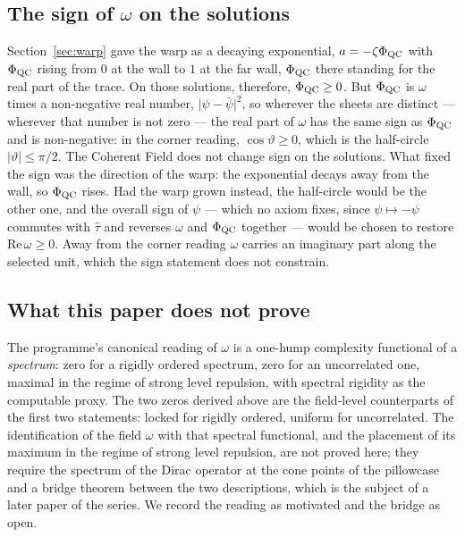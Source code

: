 \subsection{The sign of $\omega$ on the solutions}\label{sec:half-circle}

Section~\ref{sec:warp} gave the warp as a decaying exponential,
$a=-\zeta\Phi_{\mathrm{QC}}$ with $\Phi_{\mathrm{QC}}$ rising from $0$ at the wall to $1$ at the far
wall, $\Phi_{\mathrm{QC}}$ there standing for the real part of the trace. On those
solutions, therefore, $\Phi_{\mathrm{QC}}\ge0$. But $\Phi_{\mathrm{QC}}$ is $\omega$ times a
non-negative real number, $\lvert\psi-\bar\psi\rvert^{2}$, so wherever the
sheets are distinct --- wherever that number is not zero --- the real part
of $\omega$ has the same sign as $\Phi_{\mathrm{QC}}$ and is non-negative: in the corner
reading, $\cos\vartheta\ge0$, which is the half-circle
$\lvert\vartheta\rvert\le\pi/2$. The Coherent Field does not change sign on
the solutions. What fixed the sign was the direction of the warp: the
exponential decays away from the wall, so $\Phi_{\mathrm{QC}}$ rises. Had the warp grown
instead, the half-circle would be the other one, and the overall sign of
$\psi$ --- which no axiom fixes, since $\psi\mapsto-\psi$ commutes with
$\hat\tau$ and reverses $\omega$ and $\Phi_{\mathrm{QC}}$ together --- would be chosen to
restore $\mathrm{Re}\,\omega\ge0$. Away from the corner reading $\omega$
carries an imaginary part along the selected unit, which the sign statement
does not constrain. \rigD

\subsection{What this paper does not prove}\label{sec:omega-hook}

The programme's canonical reading of $\omega$ is a one-hump complexity
functional of a \emph{spectrum}: zero for a rigidly ordered spectrum,
zero for an uncorrelated one, maximal in the regime of strong level
repulsion, with spectral rigidity as the computable proxy. The two zeros
derived above are the field-level counterparts of the first two
statements: locked for rigidly ordered, uniform for uncorrelated. The
identification of the field $\omega$ with that spectral functional, and
the placement of its maximum in the regime of strong level repulsion, are
not proved here; they require the spectrum of the Dirac operator at the
cone points of the pillowcase and a bridge theorem between the two
descriptions, which is the subject of a later paper of the series. We
record the reading as motivated and the bridge as open. \rigM

